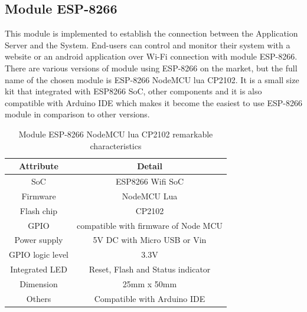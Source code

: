       \subsection{Module ESP-8266}
      This module is implemented to establish the connection between the Application Server and the System. End-users can control and monitor their system with a website or an android application over Wi-Fi connection with module ESP-8266. There are various versions of module using ESP-8266 on the market, but the full name of the chosen module is ESP-8266 NodeMCU lua CP2102. It is a small size kit that integrated with ESP8266 SoC, other components and it is also compatible with Arduino IDE which makes it become the easiest to use ESP-8266 module in comparison to other versions.
      \begin{table}[h!]
        \begin{center}
        \begin{tabular}{ |c||c|  }
          \hline
          Attribute & Detail\\
          \hline
          SoC& ESP8266 Wifi SoC\\
          \hline
          Firmware&   NodeMCU Lua\\
          \hline
          Flash chip &CP2102\\
          \hline
          GPIO & compatible with firmware of Node MCU\\
          \hline
          Power supply & 5V DC with Micro USB or Vin\\
          \hline
          GPIO logic level & 3.3V\\
          \hline
          Integrated LED & Reset, Flash and Status indicator\\
          \hline
          Dimension & 25mm x 50mm\\
          \hline
          Others& Compatible with Arduino IDE\\
          \hline
         \end{tabular}
         \caption{Module ESP-8266 NodeMCU lua CP2102 remarkable characteristics}
         \label{table:moduleEspDetail}
        \end{center}
        \end{table}

